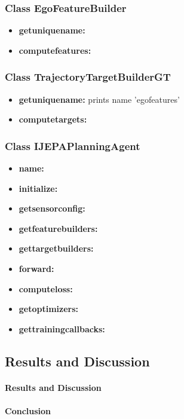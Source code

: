 \documentclass{article}
\begin{document}
\subsubsection{Class EgoFeatureBuilder}
\begin{itemize}
    \item \textbf{get\textunderscore unique\textunderscore name:} 
    \item \textbf{compute\textunderscore features:} 
\end{itemize}
\subsubsection{Class TrajectoryTargetBuilderGT}
\begin{itemize}
    \item \textbf{get\textunderscore unique\textunderscore name:} prints name 'ego\textunderscore features'
    \item \textbf{compute\textunderscore targets:} 
\end{itemize}
\subsubsection{Class IJEPAPlanningAgent}
\begin{itemize}
    \item \textbf{name:} 
    \item \textbf{initialize:} 
    \item \textbf{get\textunderscore sensor\textunderscore config:} 
    \item \textbf{get\textunderscore feature\textunderscore builders:} 
    \item \textbf{get\textunderscore target\textunderscore builders:} 
    \item \textbf{forward:}
    \item \textbf{compute\textunderscore loss:}
    \item \textbf{get\textunderscore optimizers:}  
    \item \textbf{get\textunderscore training\textunderscore callbacks:}
\end{itemize}

\subsection{Results and Discussion}
\paragraph{Results and Discussion}

\paragraph{Conclusion}



\end{document}
